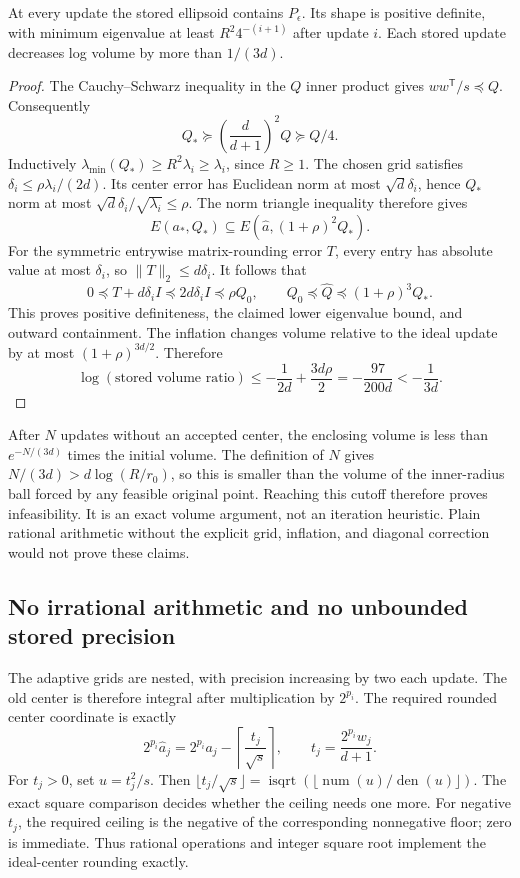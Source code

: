 \begin{proposition}
At every update the stored ellipsoid contains $P_\epsilon$.  Its shape is
positive definite, with minimum eigenvalue at least $R^2 4^{-(i+1)}$ after
update $i$.  Each stored update decreases log volume by more than $1/(3d)$.
\end{proposition}
\begin{proof}
The Cauchy--Schwarz inequality in the $Q$ inner product gives
$ww^{\mathsf T}/s\preceq Q$.  Consequently
\[
 Q_*\succeq\left(\frac d{d+1}\right)^2Q\succeq Q/4.
\]
Inductively $\lambda_{\min}(Q_*)\ge R^2\lambda_i\ge\lambda_i$, since
$R\ge1$.  The chosen grid satisfies
$\delta_i\le\rho\lambda_i/(2d)$.  Its center error has Euclidean norm at
most $\sqrt d\delta_i$, hence $Q_*$ norm at most
$\sqrt d\delta_i/\sqrt{\lambda_i}\le\rho$.  The norm triangle inequality
therefore gives
\[
 E(a_*,Q_*)\subseteq E(\widehat a,(1+\rho)^2Q_*).
\]
For the symmetric entrywise matrix-rounding error $T$, every entry has
absolute value at most $\delta_i$, so $\|T\|_2\le d\delta_i$.  It follows that
\[
 0\preceq T+d\delta_i I\preceq2d\delta_i I\preceq\rho Q_0,
 \qquad Q_0\preceq\widehat Q\preceq(1+\rho)^3Q_*.
\]
This proves positive definiteness, the claimed lower eigenvalue bound,
and outward containment.  The inflation changes volume relative to the
ideal update by at most $(1+\rho)^{3d/2}$.  Therefore
\[
 \log(\text{stored volume ratio})
 \le-\frac1{2d}+\frac{3d\rho}2
 =-\frac{97}{200d}<-\frac1{3d}.
\]
\end{proof}

After $N$ updates without an accepted center, the enclosing volume is less
than $e^{-N/(3d)}$ times the initial volume.  The definition of $N$ gives
$N/(3d)>d\log(R/r_0)$, so this is smaller than the volume of the inner-radius
ball forced by any feasible original point.  Reaching this cutoff therefore
proves infeasibility.  It is an exact volume argument, not an iteration
heuristic.  Plain rational arithmetic without the explicit grid, inflation,
and diagonal correction would not prove these claims.

\subsection{No irrational arithmetic and no unbounded stored precision}

The adaptive grids are nested, with precision increasing by two each update.
The old center is therefore integral after multiplication by $2^{p_i}$.
The required rounded center coordinate is exactly
\[
 2^{p_i}\widehat a_j
 =2^{p_i}a_j-\left\lceil\frac{t_j}{\sqrt s}\right\rceil,
 \qquad t_j=\frac{2^{p_i}w_j}{d+1}.
\]
For $t_j>0$, set $u=t_j^2/s$.  Then
$\lfloor t_j/\sqrt s\rfloor=\operatorname{isqrt}
(\lfloor\operatorname{num}(u)/\operatorname{den}(u)\rfloor)$.
The exact square comparison decides whether the ceiling needs one more.
For negative $t_j$, the required ceiling is the negative of the corresponding
nonnegative floor; zero is immediate.  Thus rational operations and integer
square root implement the ideal-center rounding exactly.


